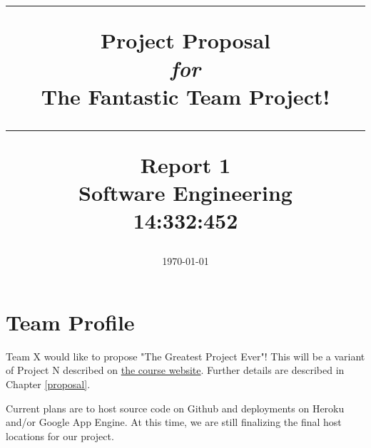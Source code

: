 \documentclass[11pt,letterpaper,oneside]{memoir}
\title{%
{\color{color2} \hrule}\vspace{1cm}
\Huge{\color{color1} Project Proposal\\ %
{\emph{for}}\\
The Fantastic Team Project!\vspace{1cm}
}
{\color{color2} \hrule}\vspace{1cm}
\Large{ \color{color2} Report 1\\
Software Engineering\\
14:332:452}
}
\author{\huge{\color{color1}Team X:\\}\vskip.1in \Large{Jeff Adler \\Eric Cuiffo\\Nick Palumbo\\Jeff Rabinowitz\\Val Red\\Dario Rethage}}
\date{\Large{\today}}
\begin{document}
\titleGM    %


\pagebreak  %
\tableofcontents %
\chapter{Team Profile}
Team X would like to propose "The Greatest Project Ever"! This will
be a variant of Project N described on
\href{http://www.ece.rutgers.edu/~marsic/books/SE/projects/}{the course website}.
Further details are described in Chapter \ref{proposal}. 

Current plans are to host source code on Github and deployments on 
Heroku and/or Google App Engine. At this time, we are still finalizing
the final host locations for our project.
\end{document}
